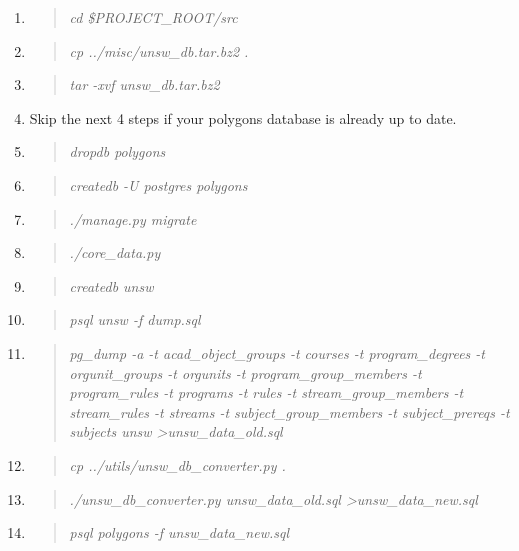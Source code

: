 \documentclass[12pt]{article}
\newenvironment{command}
   { 
      \begin{quote}\itshape
      \color{blue}
   }
   { \end{quote} }
\begin{document}
\begin{enumerate}
   \item \begin{command} cd \$PROJECT\_ROOT/src \end{command}
   \item \begin{command} cp ../misc/unsw\_db.tar.bz2 . \end{command}
   \item \begin{command} tar -xvf unsw\_db.tar.bz2 \end{command}
   \item Skip the next 4 steps if your polygons database is already up to date.
   \item \begin{command} dropdb polygons \end{command}
   \item \begin{command} createdb -U postgres polygons \end{command}
   \item \begin{command} ./manage.py migrate \end{command}
   \item \begin{command} ./core\_data.py \end{command}
   \item \begin{command} createdb unsw \end{command}
   \item \begin{command} psql unsw -f dump.sql \end{command}
   \item \begin{command} pg\_dump -a -t acad\_object\_groups -t courses -t
                         program\_degrees -t orgunit\_groups -t orgunits -t
                         program\_group\_members -t program\_rules -t programs
                         -t rules -t stream\_group\_members -t stream\_rules -t
                         streams -t subject\_group\_members -t subject\_prereqs
                         -t subjects unsw \textgreater unsw\_data\_old.sql \end{command}
   \item \begin{command} cp ../utils/unsw\_db\_converter.py . \end{command}
   \item \begin{command} ./unsw\_db\_converter.py unsw\_data\_old.sql
                         \textgreater unsw\_data\_new.sql\end{command}
   \item \begin{command} psql polygons -f unsw\_data\_new.sql \end{command}
\end{enumerate}
\end{document}
